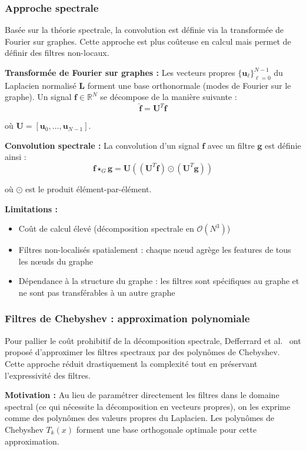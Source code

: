 \subsubsection{Approche spectrale}

Basée sur la théorie spectrale, la convolution est définie via la transformée de Fourier sur graphes. Cette approche est plus coûteuse en calcul mais permet de définir des filtres non-locaux.

\textbf{Transformée de Fourier sur graphes :}
Les vecteurs propres $\{\mathbf{u}_\ell\}_{\ell=0}^{N-1}$ du Laplacien normalisé $\mathbf{L}$ forment une base orthonormale (modes de Fourier sur le graphe). Un signal $\mathbf{f} \in \mathbb{R}^N$ se décompose de la manière suivante :
\[
\hat{\mathbf{f}} = \mathbf{U}^T \mathbf{f}
\]

où $\mathbf{U} = [\mathbf{u}_0, \ldots, \mathbf{u}_{N-1}]$.

\textbf{Convolution spectrale :}
La convolution d'un signal $\mathbf{f}$ avec un filtre $\mathbf{g}$ est définie ainsi :
\[
\mathbf{f} \star_G \mathbf{g} = \mathbf{U} \left((\mathbf{U}^T \mathbf{f}) \odot (\mathbf{U}^T \mathbf{g})\right)
\]

où $\odot$ est le produit élément-par-élément.

\textbf{Limitations :}
\begin{itemize}
    \item Coût de calcul élevé (décomposition spectrale en $\mathcal{O}(N^3)$)
    \item Filtres non-localisés spatialement : chaque nœud agrège les features de tous les nœuds du graphe
    \item Dépendance à la structure du graphe : les filtres sont spécifiques au graphe et ne sont pas transférables à un autre graphe
\end{itemize}

\subsubsection{Filtres de Chebyshev : approximation polynomiale}

Pour pallier le coût prohibitif de la décomposition spectrale, Defferrard et al.~\cite{Defferrard2016} ont proposé d'approximer les filtres spectraux par des polynômes de Chebyshev. Cette approche réduit drastiquement la complexité tout en préservant l'expressivité des filtres.

\textbf{Motivation :}
Au lieu de paramétrer directement les filtres dans le domaine spectral (ce qui nécessite la décomposition en vecteurs propres), on les exprime comme des polynômes des valeurs propres du Laplacien. Les polynômes de Chebyshev $T_k(x)$ forment une base orthogonale optimale pour cette approximation.

